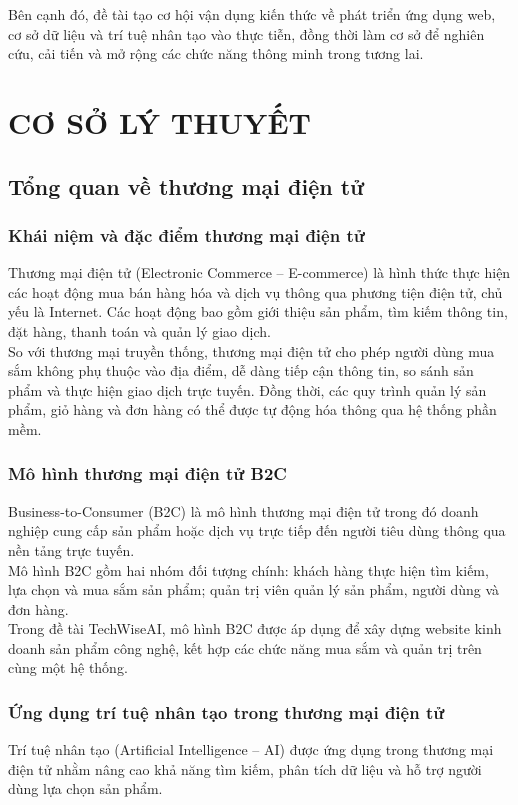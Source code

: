 \documentclass{report}
\begin{document}
Bên cạnh đó, đề tài tạo cơ hội vận dụng kiến thức về phát triển ứng dụng web, cơ sở dữ liệu và trí tuệ nhân tạo vào thực tiễn, đồng thời 
làm cơ sở để nghiên cứu, cải tiến và mở rộng các chức năng thông minh trong tương lai.

\chapter{CƠ SỞ LÝ THUYẾT}
\section{Tổng quan về thương mại điện tử}
\subsection{Khái niệm và đặc điểm thương mại điện tử}
Thương mại điện tử (Electronic Commerce -- E-commerce) là hình thức thực hiện các hoạt động mua bán hàng hóa và dịch vụ thông qua phương
 tiện điện tử, chủ yếu là Internet. Các hoạt động bao gồm giới thiệu sản phẩm, tìm kiếm thông tin, đặt hàng, thanh toán và quản lý giao 
 dịch.\\

So với thương mại truyền thống, thương mại điện tử cho phép người dùng mua sắm không phụ thuộc vào địa điểm, dễ dàng tiếp cận thông tin, so sánh sản phẩm và thực hiện giao dịch trực tuyến. Đồng thời, các quy trình quản lý sản phẩm, giỏ hàng và đơn hàng có thể được tự động hóa thông qua hệ thống phần mềm.

\subsection{Mô hình thương mại điện tử B2C}
Business-to-Consumer (B2C) là mô hình thương mại điện tử trong đó doanh nghiệp cung cấp sản phẩm hoặc dịch vụ trực tiếp đến người tiêu dùng thông qua nền tảng trực tuyến.\\

Mô hình B2C gồm hai nhóm đối tượng chính: khách hàng thực hiện tìm kiếm, lựa chọn và mua sắm sản phẩm; quản trị viên quản lý sản phẩm, người dùng và đơn hàng.\\

Trong đề tài TechWiseAI, mô hình B2C được áp dụng để xây dựng website kinh doanh sản phẩm công nghệ, kết hợp các chức năng mua sắm và quản trị trên cùng một hệ thống.

\subsection{Ứng dụng trí tuệ nhân tạo trong thương mại điện tử}
Trí tuệ nhân tạo (Artificial Intelligence -- AI) được ứng dụng trong thương mại điện tử nhằm nâng cao khả năng tìm kiếm, phân tích dữ liệu và hỗ trợ người dùng lựa chọn sản phẩm.\\
\end{document}
